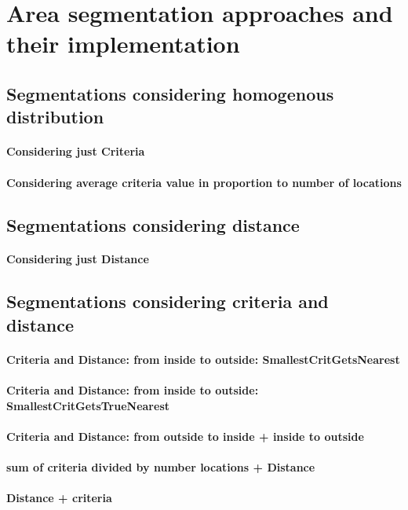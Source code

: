 \section{Area segmentation approaches and their implementation}

\subsection{Segmentations considering homogenous distribution}

\paragraph{Considering just Criteria}

\paragraph{Considering average criteria value in proportion to number of locations}

\subsection{Segmentations considering distance}

\paragraph{Considering just Distance}

\subsection{Segmentations considering criteria and distance}

\paragraph{Criteria and Distance: from inside to outside: SmallestCritGetsNearest}

\paragraph{Criteria and Distance: from inside to outside: SmallestCritGetsTrueNearest}

\paragraph{Criteria and Distance: from outside to inside + inside to outside}

\paragraph{sum of criteria divided by number locations + Distance}

\paragraph{Distance + criteria}

